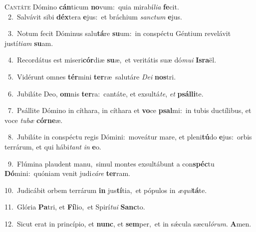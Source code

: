 \lettrine{\initial\textcolor{\initialcolor}{C}}{antáte} Dómino \textbf{cán}\-ticum \textbf{no}\-vum:~\star quia mirabí\-\textit{li}\-\textit{a} \textbf{fe}\-cit.\\
{\numbfont\textcolor{\numbcolor}{~2.}}~Salvávit sibi \textbf{déx}\-tera \textbf{e}\-jus:~\star et bráchium \textit{sanc}\-\textit{tum} \textbf{e}\-jus.\par
{\numbfont\textcolor{\numbcolor}{~3.}}~Notum fecit Dóminus salu\-\textbf{tá}\-re \textbf{su}\-um:~\star in conspéctu Géntium revelávit justí\-\textit{ti}\-\textit{am} \textbf{su}\-am.\par
{\numbfont\textcolor{\numbcolor}{~4.}}~Recordátus est miseri\-\textbf{cór}\-diæ \textbf{su}\-æ,~\star et veritátis suæ dó\-\textit{mu}\-\textit{i} \textbf{Is}\-\textbf{ra}ël.\par
{\numbfont\textcolor{\numbcolor}{~5.}}~Vidérunt omnes \textbf{tér}\-mini \textbf{ter}\-ræ~\star salutáre \textit{De}\-\textit{i} \textbf{nos}\-tri.\par
{\numbfont\textcolor{\numbcolor}{~6.}}~Jubiláte Deo, \textbf{om}\-nis \textbf{ter}\-ra:~\star cantáte, et exsultá\-\textit{te}\-, \textit{et} \textbf{psál}\-\textbf{li}te.\par
{\numbfont\textcolor{\numbcolor}{~7.}}~Psállite Dómino in cíthara, in cíthara et \textbf{vo}\-ce \textbf{psal}\-mi:~\star in tubis ductílibus, et voce \textit{tu}\-\textit{bæ} \textbf{cór}\-\textbf{ne}æ.\par
{\numbfont\textcolor{\numbcolor}{~8.}}~Jubiláte in conspéctu regis Dómini:~\dagger moveátur mare, et pleni\-\textbf{tú}\-do \textbf{e}\-jus:~\star orbis terrárum, et qui hábi\textit{tant} \textit{in} \textbf{e}\-o.\par
{\numbfont\textcolor{\numbcolor}{~9.}}~Flúmina plaudent manu,~\dagger simul montes exsultábunt a con\-\textbf{spéc}\-tu \textbf{Dó}\-mini:~\star quóniam venit judi\-\textit{cá}\-\textit{re} \textbf{ter}\-ram.\par
{\numbfont\textcolor{\numbcolor}{10.}}~Judicábit orbem terrárum \textbf{in} jus\-\textbf{tí}\-tia,~\star et pópulos in \textit{æ}\-\textit{qui}\textbf{tá}te.\par
{\numbfont\textcolor{\numbcolor}{11.}}~Glória \textbf{Pa}\-tri, et \textbf{Fí}\-lio,~\star et Spirí\-\textit{tu}\-\textit{i} \textbf{Sanc}\-to.\par
{\numbfont\textcolor{\numbcolor}{12.}}~Sicut erat in princípio, et \textbf{nunc}\-, et \textbf{sem}\-per,~\star et in sǽcula sæcu\-\textit{ló}\-\textit{rum}. \textbf{A}\-men.\par
